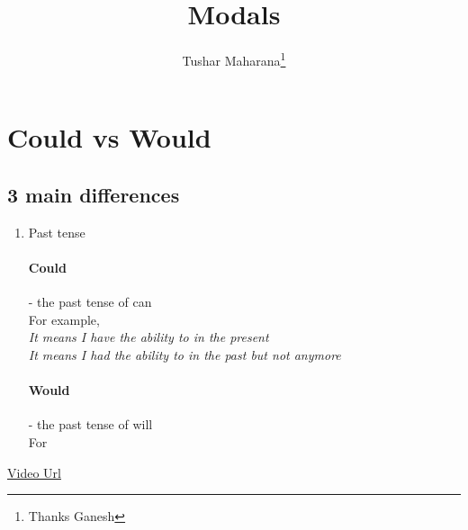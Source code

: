 \documentclass[A4]{article}
\title{Modals}
\author{Tushar Maharana\thanks{Thanks Ganesh}}
\date{}
\begin{document}
    \maketitle
    \tableofcontents
    \section*{Could vs Would}
    \subsection*{3 main differences}
    \begin{enumerate}
        \item Past tense \\
         \paragraph*{Could} - the past tense of can \\ 
         For example,\\
          \emph{It means I have the ability to in the present}\\
          \emph{It means I had the ability to in the past but not anymore}\\
         \paragraph*{Would} - the past tense of will \\
         For
    \end{enumerate}
    \href{https://www.youtube.com/watch?v=mU9lY1HF5Mc&list=PLmwr9polMHwvGTssgSU9KWEm2T4WiWaTj}{Video Url}
    
\end{document}
